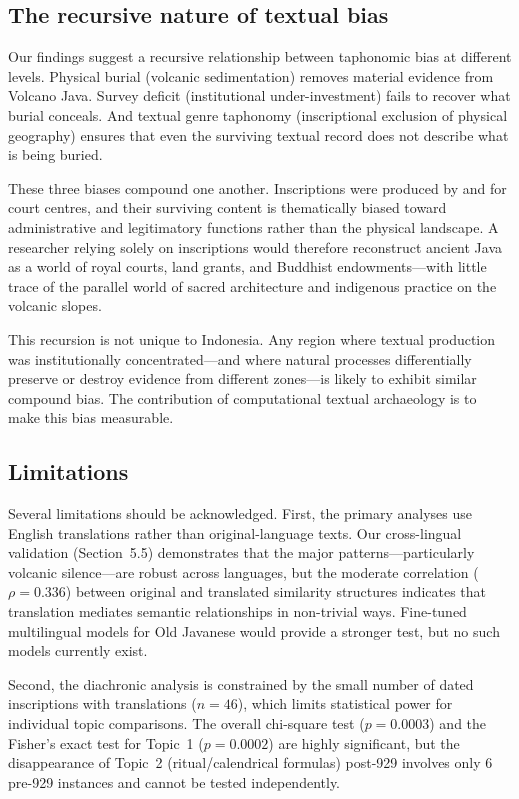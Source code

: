 \documentclass[12pt]{article}
\begin{document}
\subsection{The recursive nature of textual bias}

Our findings suggest a recursive relationship between taphonomic bias at different levels.
Physical burial (volcanic sedimentation) removes material evidence from Volcano Java.
Survey deficit (institutional under-investment) fails to recover what burial conceals.
And textual genre taphonomy (inscriptional exclusion of physical geography) ensures that even the surviving textual record does not describe what is being buried.

These three biases compound one another.
Inscriptions were produced by and for court centres, and their surviving content is thematically biased toward administrative and legitimatory functions rather than the physical landscape.
A researcher relying solely on inscriptions would therefore reconstruct ancient Java as a world of royal courts, land grants, and Buddhist endowments---with little trace of the parallel world of sacred architecture and indigenous practice on the volcanic slopes.

This recursion is not unique to Indonesia.
Any region where textual production was institutionally concentrated---and where natural processes differentially preserve or destroy evidence from different zones---is likely to exhibit similar compound bias.
The contribution of computational textual archaeology is to make this bias measurable.

\subsection{Limitations}

Several limitations should be acknowledged.
First, the primary analyses use English translations rather than original-language texts.
Our cross-lingual validation (Section~5.5) demonstrates that the major patterns---particularly volcanic silence---are robust across languages, but the moderate correlation ($\rho = 0.336$) between original and translated similarity structures indicates that translation mediates semantic relationships in non-trivial ways.
Fine-tuned multilingual models for Old Javanese would provide a stronger test, but no such models currently exist.

Second, the diachronic analysis is constrained by the small number of dated inscriptions with translations ($n = 46$), which limits statistical power for individual topic comparisons.
The overall chi-square test ($p = 0.0003$) and the Fisher's exact test for Topic~1 ($p = 0.0002$) are highly significant, but the disappearance of Topic~2 (ritual/calendrical formulas) post-929 involves only 6 pre-929 instances and cannot be tested independently.
\end{document}
